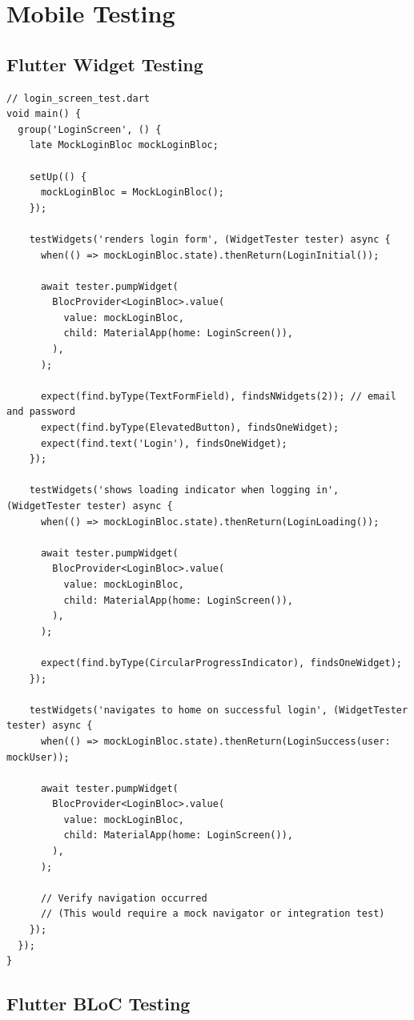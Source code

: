 \section{Mobile Testing}

\subsection{Flutter Widget Testing}

\begin{lstlisting}
// login_screen_test.dart
void main() {
  group('LoginScreen', () {
    late MockLoginBloc mockLoginBloc;

    setUp(() {
      mockLoginBloc = MockLoginBloc();
    });

    testWidgets('renders login form', (WidgetTester tester) async {
      when(() => mockLoginBloc.state).thenReturn(LoginInitial());

      await tester.pumpWidget(
        BlocProvider<LoginBloc>.value(
          value: mockLoginBloc,
          child: MaterialApp(home: LoginScreen()),
        ),
      );

      expect(find.byType(TextFormField), findsNWidgets(2)); // email and password
      expect(find.byType(ElevatedButton), findsOneWidget);
      expect(find.text('Login'), findsOneWidget);
    });

    testWidgets('shows loading indicator when logging in', (WidgetTester tester) async {
      when(() => mockLoginBloc.state).thenReturn(LoginLoading());

      await tester.pumpWidget(
        BlocProvider<LoginBloc>.value(
          value: mockLoginBloc,
          child: MaterialApp(home: LoginScreen()),
        ),
      );

      expect(find.byType(CircularProgressIndicator), findsOneWidget);
    });

    testWidgets('navigates to home on successful login', (WidgetTester tester) async {
      when(() => mockLoginBloc.state).thenReturn(LoginSuccess(user: mockUser));

      await tester.pumpWidget(
        BlocProvider<LoginBloc>.value(
          value: mockLoginBloc,
          child: MaterialApp(home: LoginScreen()),
        ),
      );

      // Verify navigation occurred
      // (This would require a mock navigator or integration test)
    });
  });
}
\end{lstlisting}

\subsection{Flutter BLoC Testing}

